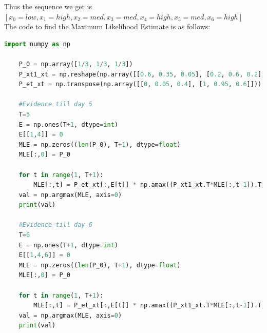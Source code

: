 \documentclass[letter, 9pt]{article}
\begin{document}
Thus the sequence we get is $[x_0=low, x_1=high, x_2=med, x_3=med, x_4=high, x_5=med, x_6=high]$\\
The code to find the Maximum Likelihood Estimate is as follows:
\begin{lstlisting}[language=Python]
    import numpy as np

    P_0 = np.array([1/3, 1/3, 1/3])
    P_xt1_xt = np.reshape(np.array([[0.6, 0.35, 0.05], [0.2, 0.6, 0.2], [0, 0.5, 0.5]]), (3, 3))
    P_et_xt = np.transpose(np.array([[0, 0.05, 0.4], [1, 0.95, 0.6]]))
    
    #Evidence till day 5
    T=5
    E = np.ones(T+1, dtype=int)
    E[[1,4]] = 0
    MLE = np.zeros((len(P_0), T+1), dtype=float)
    MLE[:,0] = P_0
    
    for t in range(1, T+1):
        MLE[:,t] = P_et_xt[:,E[t]] * np.amax((P_xt1_xt.T*MLE[:,t-1]).T, axis=0)
    val = np.argmax(MLE, axis=0)
    print(val)

    #Evidence till day 6
    T=6
    E = np.ones(T+1, dtype=int)
    E[[1,4,6]] = 0
    MLE = np.zeros((len(P_0), T+1), dtype=float)
    MLE[:,0] = P_0
    
    for t in range(1, T+1):
        MLE[:,t] = P_et_xt[:,E[t]] * np.amax((P_xt1_xt.T*MLE[:,t-1]).T, axis=0)
    val = np.argmax(MLE, axis=0)
    print(val)
\end{lstlisting}



\newpage
\end{document}
